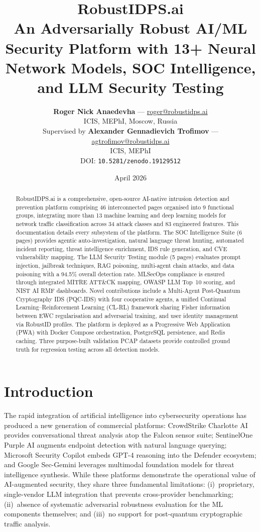 \documentclass[11pt,a4paper]{article}
\title{%
  \vspace{-1cm}
  {\LARGE\bfseries RobustIDPS.ai}\\[6pt]
  {\large An Adversarially Robust AI/ML Security Platform with 13+ Neural\\
   Network Models, SOC Intelligence, and LLM Security Testing}}
\author{%
  \textbf{Roger Nick Anaedevha} --- \href{mailto:roger@robustidps.ai}{roger@robustidps.ai}\\
  ICIS, MEPhI, Moscow, Russia\\[6pt]
  Supervised by \textbf{Alexander Gennadievich Trofimov} --- \href{mailto:agtrofimov@robustidps.ai}{agtrofimov@robustidps.ai}\\
  ICIS, MEPhI\\[8pt]
  \normalsize DOI: \texttt{10.5281/zenodo.19129512}}
\date{April 2026}
\begin{document}
\maketitle
\thispagestyle{fancy}
\begin{abstract}
\noindent
RobustIDPS.ai is a comprehensive, open-source AI-native intrusion detection and prevention platform comprising 46 interconnected pages organised into 9 functional groups, integrating more than 13 machine learning and deep learning models for network traffic classification across 34 attack classes and 83 engineered features.  This documentation details every subsystem of the platform.  The SOC Intelligence Suite (6 pages) provides agentic auto-investigation, natural language threat hunting, automated incident reporting, threat intelligence enrichment, IDS rule generation, and CVE vulnerability mapping.  The LLM Security Testing module (5 pages) evaluates prompt injection, jailbreak techniques, RAG poisoning, multi-agent chain attacks, and data poisoning with a 94.5\% overall detection rate.  MLSecOps compliance is ensured through integrated MITRE ATT\&CK mapping, OWASP LLM Top~10 scoring, and NIST AI RMF dashboards.  Novel contributions include a Multi-Agent Post-Quantum Cryptography IDS (PQC-IDS) with four cooperative agents, a unified Continual Learning--Reinforcement Learning (CL-RL) framework sharing Fisher information between EWC regularisation and adversarial training, and user identity management via RobustID profiles.  The platform is deployed as a Progressive Web Application (PWA) with Docker Compose orchestration, PostgreSQL persistence, and Redis caching.  Three purpose-built validation PCAP datasets provide controlled ground truth for regression testing across all detection models.
\end{abstract}
\section{Introduction}
\label{sec:introduction}
The rapid integration of artificial intelligence into cybersecurity operations has produced a new generation of commercial platforms: CrowdStrike Charlotte AI provides conversational threat analysis atop the Falcon sensor suite; SentinelOne Purple AI augments endpoint detection with natural language querying; Microsoft Security Copilot embeds GPT-4 reasoning into the Defender ecosystem; and Google Sec-Gemini leverages multimodal foundation models for threat intelligence synthesis.  While these platforms demonstrate the operational value of AI-augmented security, they share three fundamental limitations: (i)~proprietary, single-vendor LLM integration that prevents cross-provider benchmarking; (ii)~absence of systematic adversarial robustness evaluation for the ML components themselves; and (iii)~no support for post-quantum cryptographic traffic analysis.
\end{document}
